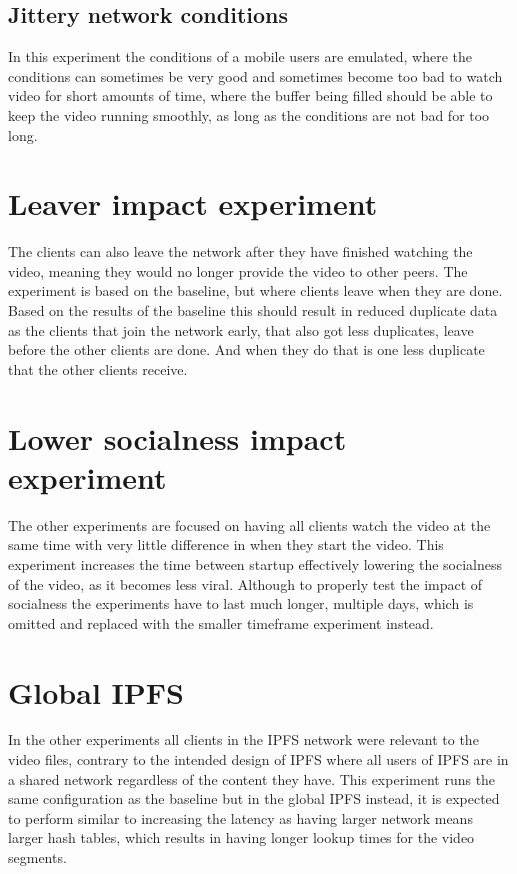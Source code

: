 \subsection{Jittery network conditions}
In this experiment the conditions of a mobile users are emulated, where the conditions can sometimes be very good and sometimes become too bad to watch video for short amounts of time, where the buffer being filled should be able to keep the video running smoothly, as long as the conditions are not bad for too long.

\section{Leaver impact experiment}
The clients can also leave the network after they have finished watching the video, meaning they would no longer provide the video to other peers. The experiment is based on the baseline, but where clients leave when they are done. Based on the results of the baseline this should result in reduced duplicate data as the clients that join the network early, that also got less duplicates, leave before the other clients are done. And when they do that is one less duplicate that the other clients receive.

\section{Lower socialness impact experiment}
The other experiments are focused on having all clients watch the video at the same time with very little difference in when they start the video. This experiment increases the time between startup effectively lowering the socialness of the video, as it becomes less viral. Although to properly test the impact of socialness the experiments have to last much longer, multiple days, which is omitted and replaced with the smaller timeframe experiment instead.

\section{Global IPFS}
In the other experiments all clients in the \acs{IPFS} network were relevant to the video files, contrary to the intended design of \acs{IPFS} where all users of \acs{IPFS} are in a shared network regardless of the content they have. This experiment runs the same configuration as the baseline but in the global \acs{IPFS} instead, it is expected to perform similar to increasing the latency as having larger network means larger hash tables, which results in having longer lookup times for the video segments.

